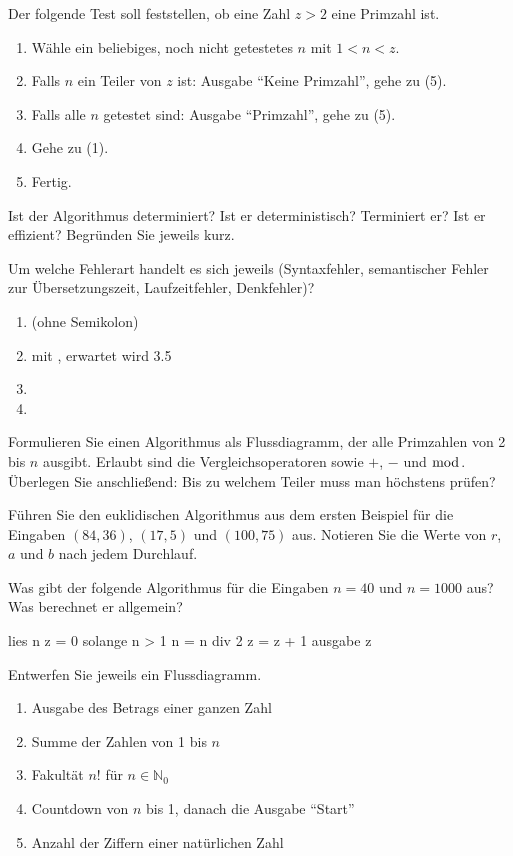 Der folgende Test soll feststellen, ob eine Zahl $z > 2$ eine Primzahl ist.
\begin{enumerate}[itemsep=0.1em, label=(\arabic*)]
\item Wähle ein beliebiges, noch nicht getestetes $n$ mit $1 < n < z$.
\item Falls $n$ ein Teiler von $z$ ist: Ausgabe \enquote{Keine Primzahl}, gehe zu (5).
\item Falls alle $n$ getestet sind: Ausgabe \enquote{Primzahl}, gehe zu (5).
\item Gehe zu (1).
\item Fertig.
\end{enumerate}
Ist der Algorithmus determiniert? Ist er deterministisch? Terminiert er? Ist er effizient? Begründen Sie jeweils kurz.

Um welche Fehlerart handelt es sich jeweils (Syntaxfehler, semantischer Fehler zur Übersetzungszeit, Laufzeitfehler, Denkfehler)?
\begin{enumerate}[label=\alph*)]
\item {} \quad (ohne Semikolon)
\item {} \quad mit , erwartet wird 3.5
\item {}
\item {}
\end{enumerate}

Formulieren Sie einen Algorithmus als Flussdiagramm, der alle Primzahlen von 2 bis $n$ ausgibt. Erlaubt sind die Vergleichsoperatoren sowie $+$, $-$ und $\bmod$. Überlegen Sie anschließend: Bis zu welchem Teiler muss man höchstens prüfen?

\ueben
{}
Führen Sie den euklidischen Algorithmus aus dem ersten Beispiel für die Eingaben $(84, 36)$, $(17, 5)$ und $(100, 75)$ aus. Notieren Sie die Werte von $r$, $a$ und $b$ nach jedem Durchlauf.

Was gibt der folgende Algorithmus für die Eingaben $n = 40$ und $n = 1000$ aus? Was berechnet er allgemein?
\begin{konsole}[Pseudocode]
lies n
z = 0
solange n > 1
    n = n div 2
    z = z + 1
ausgabe z
\end{konsole}

Entwerfen Sie jeweils ein Flussdiagramm.
\begin{enumerate}[label=\alph*)]
\item Ausgabe des Betrags einer ganzen Zahl
\item Summe der Zahlen von 1 bis $n$
\item Fakultät $n!$ für $n \in \mathbb{N}_0$
\item Countdown von $n$ bis 1, danach die Ausgabe \enquote{Start}
\item Anzahl der Ziffern einer natürlichen Zahl
\end{enumerate}

